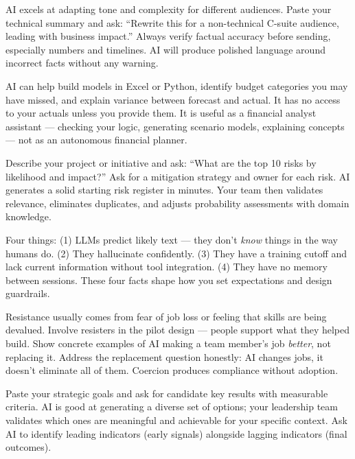 {AI excels at adapting tone and complexity for different audiences.
Paste your technical summary and ask: ``Rewrite this for a non-technical C-suite
audience, leading with business impact.''
Always verify factual accuracy before sending, especially numbers and timelines.
AI will produce polished language around incorrect facts without any warning.}

{AI can help build models in Excel or Python, identify budget categories you may have
missed, and explain variance between forecast and actual.
It has no access to your actuals unless you provide them.
It is useful as a financial analyst assistant --- checking your logic, generating
scenario models, explaining concepts --- not as an autonomous financial planner.}

{Describe your project or initiative and ask: ``What are the top 10 risks by likelihood
and impact?''
Ask for a mitigation strategy and owner for each risk.
AI generates a solid starting risk register in minutes.
Your team then validates relevance, eliminates duplicates, and adjusts probability
assessments with domain knowledge.}

{Four things: (1) LLMs predict likely text --- they don't \emph{know} things in the
way humans do. (2) They hallucinate confidently. (3) They have a training cutoff and
lack current information without tool integration. (4) They have no memory between
sessions. These four facts shape how you set expectations and design guardrails.}

{Resistance usually comes from fear of job loss or feeling that skills are being
devalued.
Involve resisters in the pilot design --- people support what they helped build.
Show concrete examples of AI making a team member's job \emph{better}, not replacing
it.
Address the replacement question honestly: AI changes jobs, it doesn't eliminate all
of them.
Coercion produces compliance without adoption.}

{Paste your strategic goals and ask for candidate key results with measurable criteria.
AI is good at generating a diverse set of options; your leadership team validates
which ones are meaningful and achievable for your specific context.
Ask AI to identify leading indicators (early signals) alongside lagging indicators
(final outcomes).}

